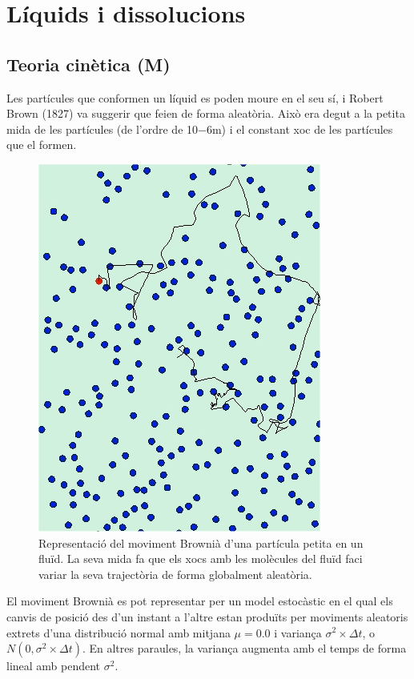 \section{Líquids i dissolucions}

\subsection{Teoria cinètica (M)}

Les partícules que conformen un líquid es poden moure en el seu sí, i Robert Brown (1827) va suggerir que feien de forma aleatòria. Això era degut a la petita mida de les partícules (de l'ordre de 10${-6}$m) i el constant xoc de les partícules que el formen.

\begin{figure}[h]
\centering
\includegraphics[scale=0.5]{figures/Brownian_motion.png}
\caption[Moviment Brownià]{Representació del moviment Brownià d'una partícula petita en un fluïd. La seva mida fa que els xocs amb les molècules del fluïd faci variar la seva trajectòria de forma globalment aleatòria.}
\label{fig:Brownian_motion}
\end{figure}

El moviment Brownià es pot representar per un model estocàstic en el qual els canvis de posició des d'un instant a l'altre estan produïts per moviments aleatoris extrets d'una distribució normal amb mitjana $\mu=0.0$ i variança $\sigma^2 \times \Delta t$, o $N(0,\sigma^2 \times \Delta t)$. En altres paraules, la variança augmenta amb el temps de forma lineal amb pendent $\sigma^2$. 

